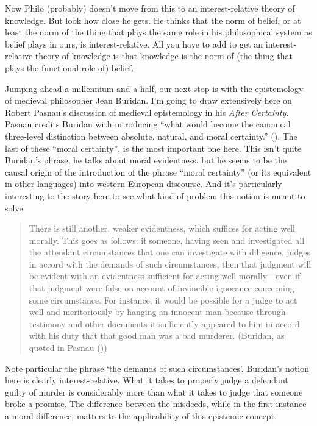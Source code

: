 \documentclass[
  10pt,
  letterpaper,
  twoside]{scrbook}
\begin{document}
Now Philo (probably) doesn't move from this to an interest-relative
theory of knowledge. But look how close he gets. He thinks that the norm
of belief, or at least the norm of the thing that plays the same role in
his philosophical system as belief plays in ours, is interest-relative.
All you have to add to get an interest-relative theory of knowledge is
that knowledge is the norm of (the thing that plays the functional role
of) belief.

Jumping ahead a millennium and a half, our next stop is with the
epistemology of medieval philosopher Jean Buridan. I'm going to draw
extensively here on Robert Pasnau's discussion of medieval epistemology
in his \emph{After Certainty}. Pasnau credits Buridan with introducing
``what would become the canonical three-level distinction between
absolute, natural, and moral certainty.''
(). The last of these ``moral
certainty'', is the most important one here. This isn't quite Buridan's
phrase, he talks about moral evidentness, but he seems to be the causal
origin of the introduction of the phrase ``moral certainty'' (or its
equivalent in other languages) into western European discourse. And it's
particularly interesting to the story here to see what kind of problem
this notion is meant to solve.

\begin{quote}
There is still another, weaker evidentness, which suffices for acting
well morally. This goes as follows: if someone, having seen and
investigated all the attendant circumstances that one can investigate
with diligence, judges in accord with the demands of such circumstances,
then that judgment will be evident with an evidentness sufficient for
acting well morally---even if that judgment were false on account of
invincible ignorance concerning some circumstance. For instance, it
would be possible for a judge to act well and meritoriously by hanging
an innocent man because through testimony and other documents it
sufficiently appeared to him in accord with his duty that that good man
was a bad murderer. (Buridan, as quoted in Pasnau
())
\end{quote}

Note particular the phrase `the demands of such circumstances'.
Buridan's notion here is clearly interest-relative. What it takes to
properly judge a defendant guilty of murder is considerably more than
what it takes to judge that someone broke a promise. The difference
between the misdeeds, while in the first instance a moral difference,
matters to the applicability of this epistemic concept.
\end{document}
